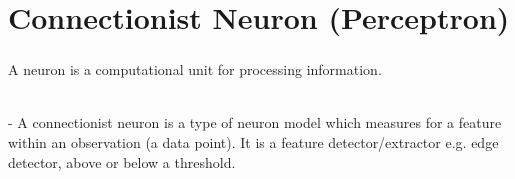 \section{Connectionist Neuron (Perceptron)}


\begin{frame}\frametitle{\secname}

A neuron is a computational unit for processing information. 

\\

\pause
- A connectionist neuron is a type of neuron model which measures for a feature within an observation (a data point). It is a feature detector/extractor e.g. edge detector, above or below a threshold.

\end{frame}

